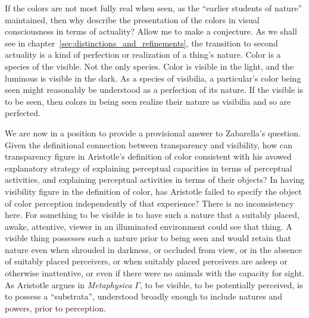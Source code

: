 If the colors are not most fully real when seen, as the ``earlier students of nature'' maintained, then why describe the presentation of the colors in visual consciousness in terms of actuality? Allow me to make a conjecture. As we shall see in chapter~\ref{sec:distinctions_and_refinements}, the transition to second actuality is a kind of perfection or realization of a thing's nature. Color is a species of the visible. Not the only species. Color is visible in the light, and the luminous is visible in the dark. As a species of visibilia, a particular's color being seen might reasonably be understood as a perfection of its nature. If the visible is to be seen, then colors in being seen realize their nature as visibilia and so are perfected.

We are now in a position to provide a provisional answer to Zabarella's question. Given the definitional connection between transparency and visibility, how can transparency figure in Aristotle's definition of color consistent with his avowed explanatory strategy of explaining perceptual capacities in terms of perceptual activities, and explaining perceptual activities in terms of their objects? In having visibility figure in the definition of color, has Aristotle failed to specify the object of color perception independently of that experience? There is no inconsistency here. For something to be visible is to have such a nature that a suitably placed, awake, attentive, viewer in an illuminated environment could see that thing. A visible thing possesses such a nature prior to being seen and would retain that nature even when shrouded in darkness, or occluded from view, or in the absence of suitably placed perceivers, or when suitably placed perceivers are asleep or otherwise inattentive, or even if there were no animals with the capacity for sight. As Aristotle argues in \emph{Metaphysica} \( \Gamma \), to be visible, to be potentially perceived, is to possess a ``substrata'', understood broadly enough to include natures and powers, prior to perception.

